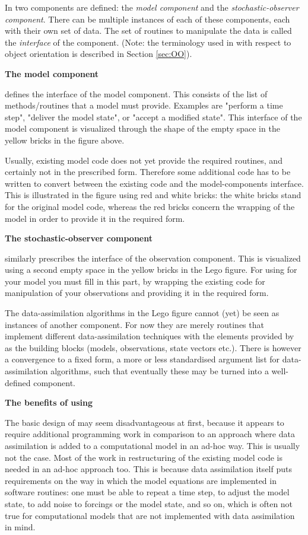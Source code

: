 In \oda two components are defined: the \emph{\oda model component} and the \emph{\oda stochastic-observer component}. There can be multiple instances of each of these components, each with their own set of data. The set of routines to manipulate the data is called the \emph{interface} of the component. (Note: the terminology used in \oda with respect to object orientation is described in Section \ref{sec:OO}).

\textbf{The \oda model component}

\oda defines the interface of the \oda model component. This consists of the list of methods/routines that a model must provide. Examples are "perform a time step", "deliver the model state", or "accept a modified state". This interface of the model component is visualized through the shape of the empty space in the yellow bricks in the figure above.

Usually, existing model code does not yet provide the required routines, and certainly not in the prescribed form. Therefore some additional code has to be written to convert between the existing code and the \oda model-components interface. This is illustrated in the figure using red and white bricks: the white bricks stand for the original model code, whereas the red bricks concern the wrapping of the model in order to provide it in the required form.

\textbf{The \oda stochastic-observer component}

\oda similarly prescribes the interface of the \oda observation component. This is visualized using a second empty space in the yellow bricks in the Lego figure. For using \oda for your model you must fill in this part, by wrapping the existing code for manipulation of your observations and providing it in the required form.

The data-assimilation algorithms in the Lego figure cannot (yet) be seen as instances of another component. For now they are merely routines that implement different data-assimilation techniques with the elements provided by \oda as the building blocks (models, observations, state vectors etc.). There is however a convergence to a fixed form, a more or less standardised argument list for data-assimilation algorithms, such that eventually these may be turned into a well-defined component.

\textbf{The benefits of using \oda}

The basic design of \oda may seem disadvantageous at first, because it appears to require additional programming work in comparison to an approach where data assimilation is added to a computational model in an ad-hoc way. This is usually not the case. Most of the work in restructuring of the existing model code is needed in an ad-hoc approach too. This is because data assimilation itself puts requirements on the way in which the model equations are implemented in software routines: one must be able to repeat a time step, to adjust the model state, to add noise to forcings or the model state, and so on, which is often not true for computational models that are not implemented with data assimilation in mind.

